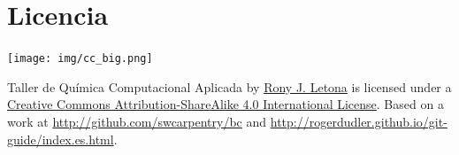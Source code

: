 \documentclass[10pt,letterpaper]{article}
\begin{document}
\section*{Licencia}

\noindent \texttt{[image: img/cc\_big.png]}

\noindent Taller de Qu\'imica Computacional Aplicada by \href{http://github.com/zronyj/TQCA}{Rony J. Letona} is licensed under a \href{http://creativecommons.org/licenses/by-sa/4.0/}{Creative Commons Attribution-ShareAlike 4.0 International License}.
Based on a work at \url{http://github.com/swcarpentry/bc} and \url{http://rogerdudler.github.io/git-guide/index.es.html}.
\end{document}
